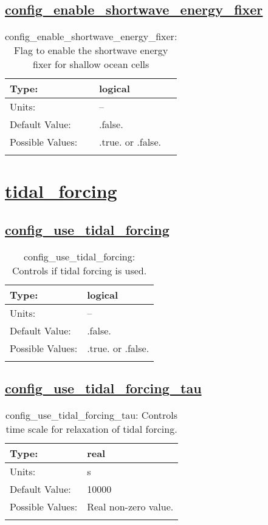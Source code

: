 \subsection[config\_enable\_shortwave\_energy\_fixer]{\hyperref[sec:nm_tab_shortwaveRadiation]{config\_enable\_shortwave\_energy\_fixer}}
\label{subsec:nm_sec_config_enable_shortwave_energy_fixer}
\begin{center}
\begin{longtable}{| p{2.0in} || p{4.0in} |}
    \hline
    Type: & logical \\
    \hline
    Units: & -- \\
    \hline
    Default Value: & .false. \\
    \hline
    Possible Values: & .true. or .false. \\
    \hline
    \caption{config\_enable\_shortwave\_energy\_fixer: Flag to enable the shortwave energy fixer for shallow ocean cells}
\end{longtable}
\end{center}
\section[tidal\_forcing]{\hyperref[sec:nm_tab_tidal_forcing]{tidal\_forcing}}
\label{sec:nm_sec_tidal_forcing}
\subsection[config\_use\_tidal\_forcing]{\hyperref[sec:nm_tab_tidal_forcing]{config\_use\_tidal\_forcing}}
\label{subsec:nm_sec_config_use_tidal_forcing}
\begin{center}
\begin{longtable}{| p{2.0in} || p{4.0in} |}
    \hline
    Type: & logical \\
    \hline
    Units: & -- \\
    \hline
    Default Value: & .false. \\
    \hline
    Possible Values: & .true. or .false. \\
    \hline
    \caption{config\_use\_tidal\_forcing: Controls if tidal forcing is used.}
\end{longtable}
\end{center}
\subsection[config\_use\_tidal\_forcing\_tau]{\hyperref[sec:nm_tab_tidal_forcing]{config\_use\_tidal\_forcing\_tau}}
\label{subsec:nm_sec_config_use_tidal_forcing_tau}
\begin{center}
\begin{longtable}{| p{2.0in} || p{4.0in} |}
    \hline
    Type: & real \\
    \hline
    Units: & \si{s} \\
    \hline
    Default Value: & 10000 \\
    \hline
    Possible Values: & Real non-zero value. \\
    \hline
    \caption{config\_use\_tidal\_forcing\_tau: Controls time scale for relaxation of tidal forcing.}
\end{longtable}
\end{center}
